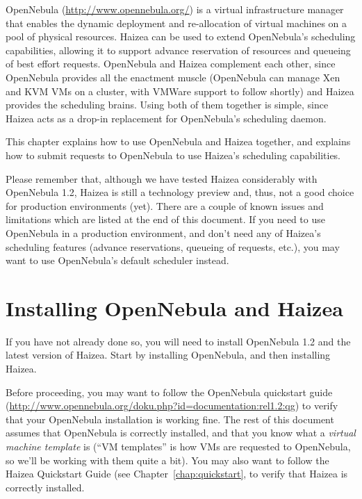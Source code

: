 OpenNebula (\url{http://www.opennebula.org/}) is a virtual infrastructure manager that enables the dynamic deployment and re-allocation of virtual machines on a pool of physical resources. Haizea can be used to extend OpenNebula's scheduling capabilities, allowing it to support advance reservation of resources and queueing of best effort requests. OpenNebula and Haizea complement each other, since OpenNebula provides all the enactment muscle (OpenNebula can manage Xen and KVM VMs on a cluster, with VMWare support to follow shortly) and Haizea provides the scheduling brains. Using both of them together is simple, since Haizea acts as a drop-in replacement for OpenNebula's scheduling daemon. 

This chapter explains how to use OpenNebula and Haizea together, and explains how to submit requests to OpenNebula to use Haizea's scheduling capabilities.

\begin{warning}
Please remember that, although we have tested Haizea considerably with OpenNebula 1.2, Haizea is still a technology preview and, thus, not a good choice for production environments (yet). There are a couple of known issues and limitations which are listed at the end of this document. If you need to use OpenNebula in a production environment, and don't need any of Haizea's scheduling features (advance reservations, queueing of requests, etc.), you may want to use OpenNebula's default scheduler instead.
\end{warning}

\section{Installing OpenNebula and Haizea}

If you have not already done so, you will need to install OpenNebula 1.2 and the latest version of Haizea. Start by installing OpenNebula, and then installing Haizea.

Before proceeding, you may want to follow the OpenNebula quickstart guide (\url{http://www.opennebula.org/doku.php?id=documentation:rel1.2:qg}) to verify that your OpenNebula installation is working fine. The rest of this document assumes that OpenNebula is correctly installed, and that you know what a \emph{virtual machine template} is (``VM templates'' is how VMs are requested to OpenNebula, so we'll be working with them quite a bit). You may also want to follow the Haizea Quickstart Guide (see Chapter~\ref{chap:quickstart}, to verify that Haizea is correctly installed.

